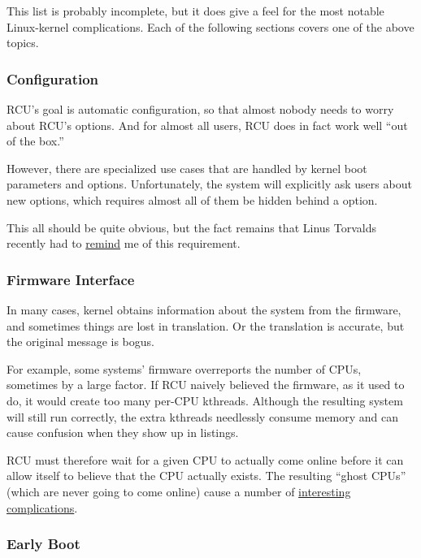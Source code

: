 This list is probably incomplete, but it does give a feel for the most
notable Linux-kernel complications.
Each of the following sections
covers one of the above topics.


\subsubsection{Configuration}

RCU's goal is automatic configuration, so that almost nobody needs to
worry about RCU's  options.
And for almost all users, RCU
does in fact work well ``out of the box.''

However, there are specialized use cases that are handled by kernel boot
parameters and  options.
Unfortunately, the 
system will explicitly ask users about new  options, which
requires almost all of them be hidden behind a 
 option.

This all should be quite obvious, but the fact remains that Linus
Torvalds recently had to
\href{https://lore.kernel.org/r/CA+55aFy4wcCwaL4okTs8wXhGZ5h-ibecy_Meg9C4MNQrUnwMcg@mail.gmail.com>}{remind}
me of this requirement.


\subsubsection{Firmware Interface}

In many cases, kernel obtains information about the system from the
firmware, and sometimes things are lost in translation.
Or the
translation is accurate, but the original message is bogus.

For example, some systems' firmware overreports the number of CPUs,
sometimes by a large factor.
If RCU naively believed the firmware, as it
used to do, it would create too many per-CPU kthreads.
Although the
resulting system will still run correctly, the extra kthreads needlessly
consume memory and can cause confusion when they show up in 
listings.

RCU must therefore wait for a given CPU to actually come online before
it can allow itself to believe that the CPU actually exists.
The
resulting ``ghost CPUs'' (which are never going to come online) cause a
number of \href{https://paulmck.livejournal.com/37494.html}{interesting complications}.


\subsubsection{Early Boot}

